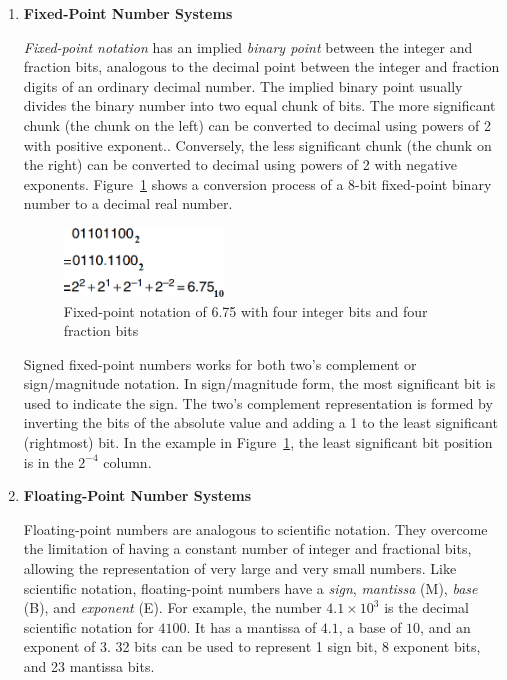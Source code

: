 \documentclass[12pt]{article}
\numberwithin{figure}{subsection}
\numberwithin{table}{subsection}
\numberwithin{equation}{subsection}
\begin{document}
\begin{enumerate}
  \item \textbf{Fixed-Point Number Systems}

  \textit{Fixed-point notation} has an implied \textit{binary point} between the integer and fraction bits, analogous to the decimal point between the integer and fraction digits of an ordinary decimal number. The implied binary point usually divides the binary number into two equal chunk of bits. The more significant chunk (the chunk on the left) can be converted to decimal using powers of 2 with positive exponent.. Conversely, the less significant chunk (the chunk on the right) can be converted to decimal using powers of 2 with negative exponents. Figure~\ref{fig:fixed_point_notation_example} shows a conversion process of a 8-bit fixed-point binary number to a decimal real number.

  \begin{figure}[ht]
    \centering
    \includegraphics[width=0.4\textwidth]{fixed_point_notation_example.png}
    \caption{Fixed-point notation of 6.75 with four integer bits and four fraction bits}
    \label{fig:fixed_point_notation_example}
  \end{figure}

  Signed fixed-point numbers works for both two's complement or sign/magnitude notation. In sign/magnitude form, the most significant bit is used to indicate the sign. The two's complement representation is formed by inverting the bits of the absolute value and adding a 1 to the least significant (rightmost) bit. In the example in Figure~\ref{fig:fixed_point_notation_example}, the least significant bit position is in the $2^{-4}$ column.

  \item \textbf{Floating-Point Number Systems}

  Floating-point numbers are analogous to scientific notation. They overcome the limitation of having a constant number of integer and fractional bits, allowing the representation of very large and very small numbers. Like scientific notation, floating-point numbers have a \textit{sign}, \textit{mantissa} (M), \textit{base} (B), and \textit{exponent} (E). For example, the number $4.1 \times 10^3$ is the decimal scientific notation for $4100$. It has a mantissa of $4.1$, a base of $10$, and an exponent of $3$. 32 bits can be used to represent 1 sign bit, 8 exponent bits, and 23 mantissa bits.


\end{enumerate}
\end{document}
